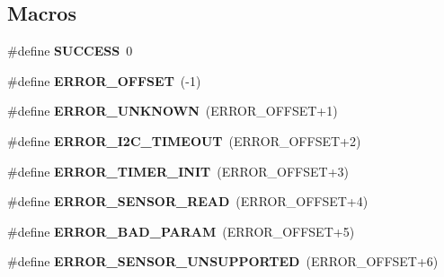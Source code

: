 \subsection*{Macros}
\begin{DoxyCompactItemize}
\item 
\mbox{\label{group___base_sensors_module_gaa90cac659d18e8ef6294c7ae337f6b58}} 
\#define {\bfseries S\+U\+C\+C\+E\+SS}~0
\item 
\mbox{\label{group___base_sensors_module_ga34da2490156c0fde3a3a9e8b658e6639}} 
\#define {\bfseries E\+R\+R\+O\+R\+\_\+\+O\+F\+F\+S\+ET}~(-\/1)
\item 
\mbox{\label{group___base_sensors_module_gade5d86f955604ec489f0c144f47226fc}} 
\#define {\bfseries E\+R\+R\+O\+R\+\_\+\+U\+N\+K\+N\+O\+WN}~(E\+R\+R\+O\+R\+\_\+\+O\+F\+F\+S\+ET+1)
\item 
\mbox{\label{group___base_sensors_module_gaba40c0c761ca246f8a9142158af8bf3c}} 
\#define {\bfseries E\+R\+R\+O\+R\+\_\+\+I2\+C\+\_\+\+T\+I\+M\+E\+O\+UT}~(E\+R\+R\+O\+R\+\_\+\+O\+F\+F\+S\+ET+2)
\item 
\mbox{\label{group___base_sensors_module_ga9a179f25b9f06c45083dc64b4e5915c2}} 
\#define {\bfseries E\+R\+R\+O\+R\+\_\+\+T\+I\+M\+E\+R\+\_\+\+I\+N\+IT}~(E\+R\+R\+O\+R\+\_\+\+O\+F\+F\+S\+ET+3)
\item 
\mbox{\label{group___base_sensors_module_ga3f1d35afc7c80acc7707e6d3525ac162}} 
\#define {\bfseries E\+R\+R\+O\+R\+\_\+\+S\+E\+N\+S\+O\+R\+\_\+\+R\+E\+AD}~(E\+R\+R\+O\+R\+\_\+\+O\+F\+F\+S\+ET+4)
\item 
\mbox{\label{group___base_sensors_module_ga63a823f81897c011cdae5d765a12f379}} 
\#define {\bfseries E\+R\+R\+O\+R\+\_\+\+B\+A\+D\+\_\+\+P\+A\+R\+AM}~(E\+R\+R\+O\+R\+\_\+\+O\+F\+F\+S\+ET+5)
\item 
\mbox{\label{group___base_sensors_module_ga6ad7c93bd79b954be3a51a855111a3c4}} 
\#define {\bfseries E\+R\+R\+O\+R\+\_\+\+S\+E\+N\+S\+O\+R\+\_\+\+U\+N\+S\+U\+P\+P\+O\+R\+T\+ED}~(E\+R\+R\+O\+R\+\_\+\+O\+F\+F\+S\+ET+6)

\end{DoxyCompactItemize}
